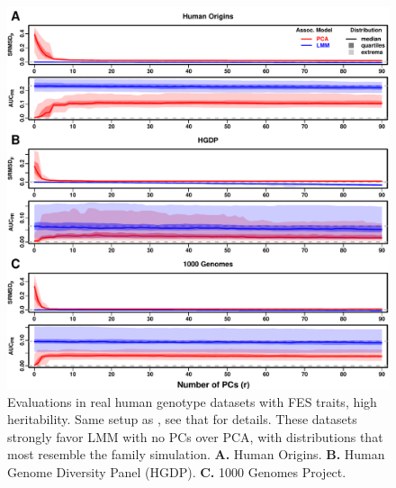 \documentclass[9pt,lineno]{elife}
\begin{document}
\begin{figure}
  \begin{fullwidth}
    \includegraphics[width=\linewidth,height=\textheight,keepaspectratio]{fes/rmsd-auc-real.pdf}
    \caption{
      Evaluations in real human genotype datasets with FES traits, high heritability.
      Same setup as , see that for details.
      These datasets strongly favor LMM with no PCs over PCA, with distributions that most resemble the family simulation.
      \textbf{A.}
      Human Origins.
      \textbf{B.}
      Human Genome Diversity Panel (HGDP).
      \textbf{C.}
      1000 Genomes Project.
    }
    \label{fig:rmsd-auc-real}

\end{fullwidth}
\end{figure}
\end{document}
